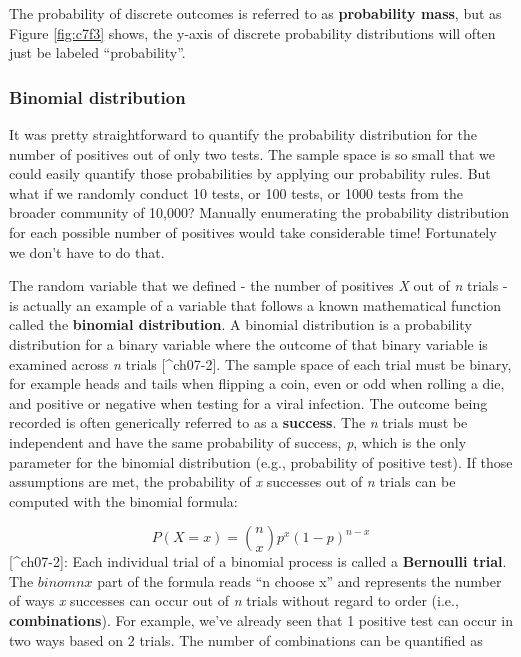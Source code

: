 \documentclass[
]{book}
\begin{document}
The probability of discrete outcomes is referred to as \textbf{probability mass}, but as Figure \ref{fig:c7f3} shows, the y-axis of discrete probability distributions will often just be labeled ``probability''.

\subsubsection{Binomial distribution}\label{binomial-distribution}

It was pretty straightforward to quantify the probability distribution for the number of positives out of only two tests. The sample space is so small that we could easily quantify those probabilities by applying our probability rules. But what if we randomly conduct 10 tests, or 100 tests, or 1000 tests from the broader community of 10,000? Manually enumerating the probability distribution for each possible number of positives would take considerable time! Fortunately we don't have to do that.

The random variable that we defined - the number of positives \emph{X} out of \emph{n} trials - is actually an example of a variable that follows a known mathematical function called the \textbf{binomial distribution}. A binomial distribution is a probability distribution for a binary variable where the outcome of that binary variable is examined across \emph{n} trials {[}\^{}ch07-2{]}. The sample space of each trial must be binary, for example heads and tails when flipping a coin, even or odd when rolling a die, and positive or negative when testing for a viral infection. The outcome being recorded is often generically referred to as a \textbf{success}. The \emph{n} trials must be independent and have the same probability of success, \emph{p}, which is the only parameter for the binomial distribution (e.g., probability of positive test). If those assumptions are met, the probability of \emph{x} successes out of \emph{n} trials can be computed with the binomial formula:

\[
P(X = x) = \binom{n}{x} p^x (1 - p)^{n - x}
\]
{[}\^{}ch07-2{]}: Each individual trial of a binomial process is called a \textbf{Bernoulli trial}. The \(binom{n}{x}\) part of the formula reads ``n choose x'' and represents the number of ways \emph{x} successes can occur out of \emph{n} trials without regard to order (i.e., \textbf{combinations}). For example, we've already seen that 1 positive test can occur in two ways based on 2 trials. The number of combinations can be quantified as
\end{document}
